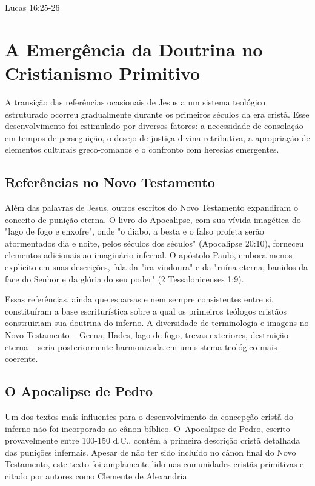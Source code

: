Lucas 16:25-26

\section{A Emergência da Doutrina no Cristianismo Primitivo}

A transição das referências ocasionais de Jesus a um sistema teológico estruturado ocorreu gradualmente durante os primeiros séculos da era cristã. Esse desenvolvimento foi estimulado por diversos fatores: a necessidade de consolação em tempos de perseguição, o desejo de justiça divina retributiva, a apropriação de elementos culturais greco-romanos e o confronto com heresias emergentes.

\subsection{Referências no Novo Testamento}

Além das palavras de Jesus, outros escritos do Novo Testamento expandiram o conceito de punição eterna. O livro do Apocalipse, com sua vívida imagética do "lago de fogo e enxofre", onde "o diabo, a besta e o falso profeta serão atormentados dia e noite, pelos séculos dos séculos" (Apocalipse 20:10), forneceu elementos adicionais ao imaginário infernal. O apóstolo Paulo, embora menos explícito em suas descrições, fala da "ira vindoura" e da "ruína eterna, banidos da face do Senhor e da glória do seu poder" (2 Tessalonicenses 1:9).

Essas referências, ainda que esparsas e nem sempre consistentes entre si, constituíram a base escriturística sobre a qual os primeiros teólogos cristãos construiriam sua doutrina do inferno. A diversidade de terminologia e imagens no Novo Testamento -- Geena, Hades, lago de fogo, trevas exteriores, destruição eterna -- seria posteriormente harmonizada em um sistema teológico mais coerente.

\subsection{O Apocalipse de Pedro}

Um dos textos mais influentes para o desenvolvimento da concepção cristã do inferno não foi incorporado ao cânon bíblico. O Apocalipse de Pedro, escrito provavelmente entre 100-150 d.C., contém a primeira descrição cristã detalhada das punições infernais. Apesar de não ter sido incluído no cânon final do Novo Testamento, este texto foi amplamente lido nas comunidades cristãs primitivas e citado por autores como Clemente de Alexandria.


